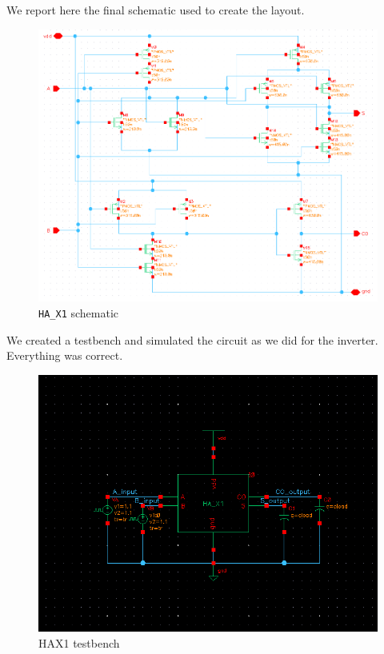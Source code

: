 \documentclass[a4paper]{article}
\newcommand{\ha}{\texttt{HA\_X1}\xspace}
\begin{document}
We report here the final schematic used to create the layout.

\begin{figure}[H]
      \centering
       \includegraphics[width=\linewidth]{./Images/HA/HAX1_schematic.png}
\caption{\ha schematic}
\label{fig: HAX1_sch}
\end{figure}

We created a testbench and simulated the circuit as we did for the inverter. Everything was correct.

\begin{figure}[H]
      \centering
       \includegraphics[width=12cm]{./Images/HA/HAX1_TB_schematic.png}
\caption{HAX1 testbench}
\label{fig: HAX1_tb}
\end{figure}
\end{document}
